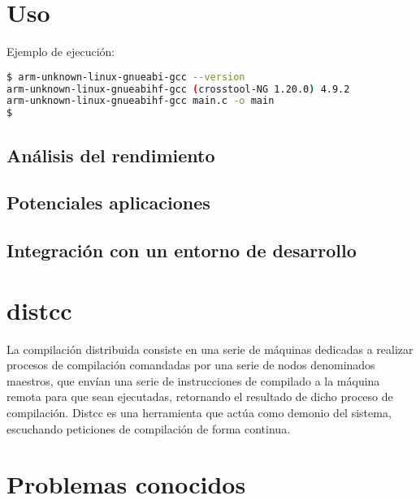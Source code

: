 \documentclass{article}
\begin{document}
\section{Uso}

Ejemplo de ejecución:

\begin{lstlisting}[language=bash]
$ arm-unknown-linux-gnueabi-gcc --version
arm-unknown-linux-gnueabihf-gcc (crosstool-NG 1.20.0) 4.9.2
arm-unknown-linux-gnueabihf-gcc main.c -o main
$
\end{lstlisting}

\subsection{Análisis del rendimiento}

\subsection{Potenciales aplicaciones}

\subsection{Integración con un entorno de desarrollo}







\section{distcc}

La compilación distribuida consiste en una serie de máquinas dedicadas a realizar procesos de compilación comandadas por una serie de nodos denominados maestros, que envían una serie de instrucciones de compilado a la máquina remota para que sean ejecutadas, retornando el resultado de dicho proceso de compilación. Distcc es una herramienta que actúa como demonio del sistema, escuchando peticiones de compilación de forma continua.

\section{Problemas conocidos}
\end{document}
